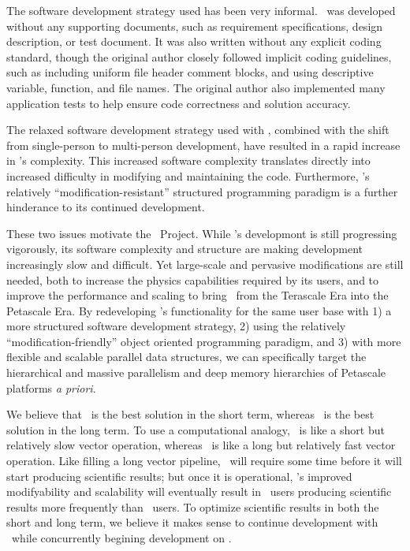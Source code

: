 \documentclass[11pt]{article}
\begin{document}
    The software development strategy used has been very informal.
    \enzo\ was developed without any supporting documents, such as
    requirement specifications, design description, or test document.
    It was also written without any explicit coding standard, though
    the original author closely followed implicit coding guidelines,
    such as including uniform file header comment blocks, and using
    descriptive variable, function, and file names.  The original
    author also implemented many application tests to help ensure
    code correctness and solution accuracy.  

    The relaxed software development strategy used with \enzo,
    combined with the shift from single-person to multi-person
    development, have resulted in a rapid increase in \enzo's
    complexity.  This increased software complexity translates
    directly into increased difficulty in modifying and maintaining
    the code.  Furthermore, \enzo's relatively
    ``modification-resistant'' structured programming
    paradigm is a further hinderance to its continued
    development.
    


    These two issues motivate the \cello\ Project.  While \enzo's
    developmont is still progressing vigorously, its software
    complexity and structure are making development increasingly slow
    and difficult.  Yet large-scale and pervasive modifications are
    still needed, both to increase the physics capabilities required
    by its users, and to improve the performance and scaling to bring
    \enzo\ from the Terascale Era into the Petascale Era.  By
    redeveloping \enzo's functionality for the same user base with 1)
    a more structured software development strategy, 2) using the
    relatively ``modification-friendly'' object oriented programming
    paradigm, and 3) with more flexible and scalable
    parallel data structures, we can specifically target the hierarchical and
    massive parallelism and deep memory hierarchies of Petascale
    platforms \textit{a priori}.


    We believe that \enzo\ is the best solution in the short term,
    whereas \cello\ is the best solution in the long term.  To use a
    computational analogy, \enzo\ is like a short but relatively slow
    vector operation, whereas \cello\ is like a long but relatively
    fast vector operation.  Like filling a long vector pipeline,
    \cello\ will require some time before it will start producing
    scientific results; but once it is operational, \cello's improved
    modifyability and scalability will eventually result in \cello\
    users producing scientific results more frequently than \enzo\
    users.  To optimize scientific results in both the short and long
    term, we believe it makes sense to continue development with
    \enzo\ while concurrently begining development on \cello.
  
\end{document}
